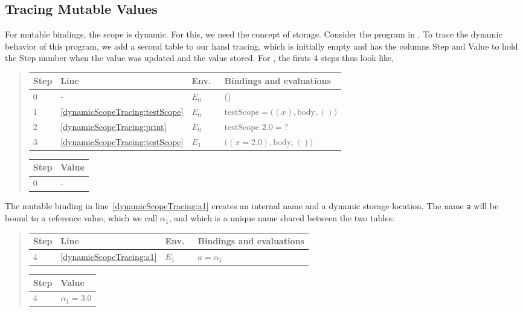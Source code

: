 \documentclass[fsharpNotes.tex]{subfiles}
\begin{document}
\subsection{Tracing Mutable Values}
For mutable bindings, the scope is dynamic. For this, we need the concept of storage. Consider the program in .
%
%
To trace the dynamic behavior of this program, we add a second table to our hand tracing, which is initially empty and has the columns Step and Value to hold the Step number when the value was updated and the value stored. For , the firsts 4 steps thus look like,
\begin{quote}
  \begin{tabular*}{0.65\linewidth}[t]{l|lll}
    Step & Line & Env.\ & Bindings and evaluations\\
    \hline
    0 & - & $E_0$ & ()\\
    1 &\ref{dynamicScopeTracing:testScope} & $E_0$ & $\text{testScope} = \big((x), \text{body}, ()\big)$\\
    2 &\ref{dynamicScopeTracing:print} & $E_0$ & $\text{testScope } 2.0 = \text{?}$\\
    3 &\ref{dynamicScopeTracing:testScope} & $E_1$ & $\big((x=2.0), \text{body}, ()\big)$\\
  \end{tabular*}
  \hspace*{0.03\linewidth}
  \begin{tabular*}{0.25\linewidth}[t]{l|l}
    Step & Value\\
    \hline
    0 & -\\
  \end{tabular*}
\end{quote}
The mutable binding in line~\ref{dynamicScopeTracing:a1} creates an internal name and a dynamic storage location. The name \lstinline{a} will be bound to a reference value, which we call $\alpha_1$, and which is a unique name shared between the two tables:
\begin{quote}
  \begin{tabular*}{0.65\linewidth}[t]{l|lll}
    Step & Line & Env.\ & Bindings and evaluations\\
    \hline
    4 &\ref{dynamicScopeTracing:a1} & $E_1$ & $a = \alpha_1$\\
  \end{tabular*}
  \hspace*{0.03\linewidth}
  \begin{tabular*}{0.25\linewidth}[t]{l|l}
    Step & Value\\
    \hline
    4 & $\alpha_1 = 3.0$\\
  \end{tabular*}
\end{quote}
\end{document}
